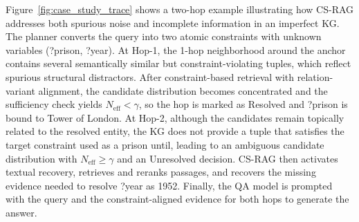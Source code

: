 \documentclass{article}
\theoremstyle{plain}
\theoremstyle{definition}
\theoremstyle{remark}
\begin{document}
Figure~\ref{fig:case_study_trace} shows a two-hop example illustrating how CS-RAG addresses both spurious noise and incomplete information in an imperfect KG.
The planner converts the query into two atomic constraints with unknown variables (?prison, ?year).
At Hop-1, the 1-hop neighborhood around the anchor contains several semantically similar but constraint-violating tuples, which reflect spurious structural distractors.
After constraint-based retrieval with relation-variant alignment, the candidate distribution becomes concentrated and the sufficiency check yields $N_{\text{eff}}<\gamma$, so the hop is marked as Resolved and ?prison is bound to Tower of London.
At Hop-2, although the candidates remain topically related to the resolved entity, the KG does not provide a tuple that satisfies the target constraint used as a prison until, leading to an ambiguous candidate distribution with $N_{\text{eff}}\ge\gamma$ and an Unresolved decision.
CS-RAG then activates textual recovery, retrieves and reranks passages, and recovers the missing evidence needed to resolve ?year as 1952.
Finally, the QA model is prompted with the query and the constraint-aligned evidence for both hops to generate the answer.
\end{document}
